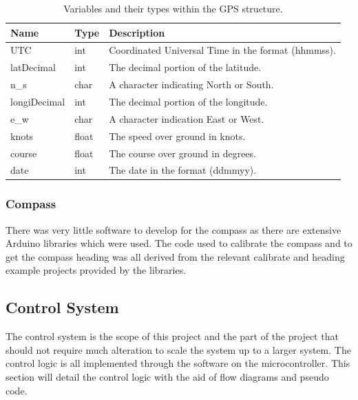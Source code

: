 	\begin{table}[!ht]
		\begin{center}
			\caption{Variables and their types within the GPS structure.}
			\label{tab:3:GPSstruct}
			\begin{tabular}{|l|l|l|}
				\hline
				\textbf{Name} & \textbf{Type} & \textbf{Description} \\
				\hline
				UTC & int & Coordinated Universal Time in the format (hhmmss). \\
				\hline
				latDecimal & int & The decimal portion of the latitude. \\
				\hline
				n\_s & char & A character indicating North or South. \\
				\hline 
				longiDecimal & int & The decimal portion of the longitude. \\
				\hline 
				e\_w & char & A character indication East or West. \\
				\hline
				knots & float & The speed over ground in knots. \\
				\hline
				course & float & The course over ground in degrees. \\
				\hline
				date & int & The date in the format (ddmmyy). \\
				\hline
			\end{tabular}
		\end{center}
	\end{table}
	\subsubsection{Compass}
	There was very little software to develop for the compass as there are extensive Arduino libraries which were used. The code used to calibrate the compass and to get the compass heading was all derived from the relevant calibrate and heading example projects provided by the libraries. \cite{Pololu2016}
	\subsection{Control System}
	The control system is the scope of this project and the part of the project that should not require much alteration to scale the system up to a larger system. The control logic  is all implemented through the software on the microcontroller. This section will detail the control logic with the aid of flow diagrams and pseudo code. 
